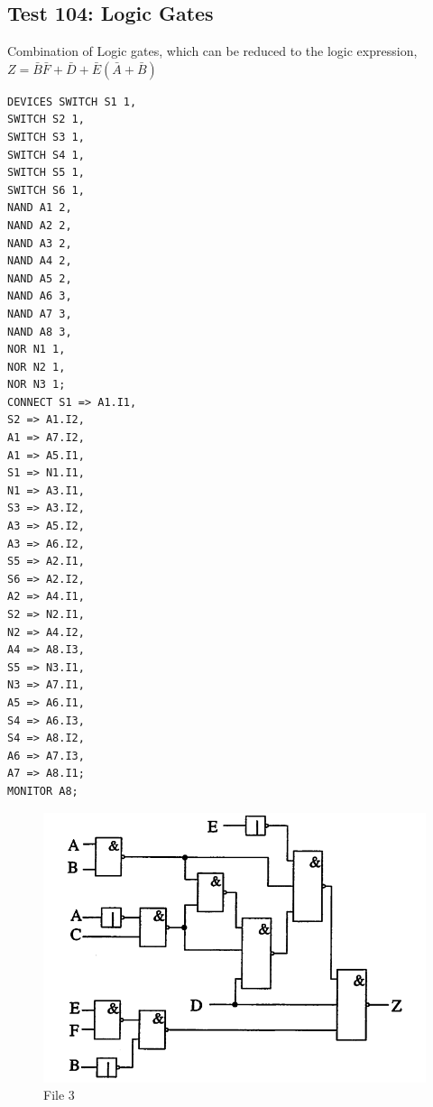 \documentclass[12pt]{article}
\begin{document}
\newpage
\subsection{Test 104: Logic Gates}
Combination of Logic gates, which can be reduced to the logic expression, $Z = \bar{B}\bar{F} + \bar{D} + \bar{E}(\bar{A} + \bar{B})$\\
\begin{verbatim}
DEVICES	SWITCH S1 1,
SWITCH S2 1,
SWITCH S3 1,
SWITCH S4 1,
SWITCH S5 1,
SWITCH S6 1,
NAND A1 2,
NAND A2 2,
NAND A3 2,
NAND A4 2,
NAND A5 2,
NAND A6 3,
NAND A7 3,
NAND A8 3,
NOR N1 1,
NOR N2 1,
NOR N3 1;
CONNECT	S1 => A1.I1,
S2 => A1.I2,
A1 => A7.I2,
A1 => A5.I1,
S1 => N1.I1,
N1 => A3.I1,
S3 => A3.I2,
A3 => A5.I2,
A3 => A6.I2,
S5 => A2.I1,
S6 => A2.I2,
A2 => A4.I1,
S2 => N2.I1,
N2 => A4.I2,
A4 => A8.I3,
S5 => N3.I1,
N3 => A7.I1,
A5 => A6.I1,
S4 => A6.I3,
S4 => A8.I2,
A6 => A7.I3,
A7 => A8.I1;
MONITOR A8;
\end{verbatim}

\begin{figure}[H]
	\centering
	\includegraphics[width=0.9\linewidth]{figures/Test104.png}
	\captionsetup{width=.7\linewidth}
	\caption{File 3}
	\label{fig:5}
\end{figure}
\end{document}
